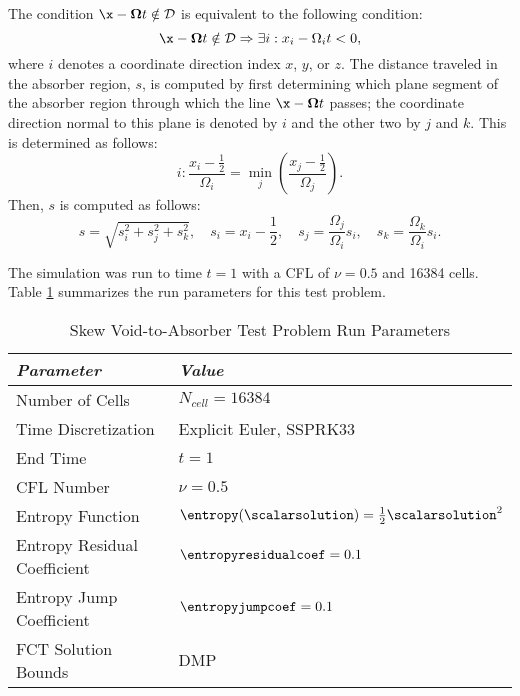 The condition $\x-\mathbf{\Omega}t\notin\mathcal{D}$ is equivalent to the
following condition:
\[
   \x-\mathbf{\Omega}t\notin\mathcal{D} \Rightarrow
   \exists i: x_i-\Omega_i t < 0,
\]
where $i$ denotes a coordinate direction index $x$, $y$, or $z$.
The distance traveled in the absorber region, $s$, is computed
by first determining which plane segment of the absorber region
through which the line $\x-\mathbf{\Omega}t$ passes; the coordinate
direction normal to this plane is denoted by $i$ and the other
two by $j$ and $k$. This is determined as follows:
\[
   i: \frac{x_i-\frac{1}{2}}{\Omega_i} = \min\limits_j\left(
      \frac{x_j-\frac{1}{2}}{\Omega_j}\right).
\]
Then, $s$ is computed as follows:
\begin{equation}\label{eq:s_distance}
   s=\sqrt{s_i^2 + s_j^2 + s_k^2}, \quad
   s_i=x_i-\frac{1}{2}, \quad
   s_j=\frac{\Omega_j}{\Omega_i}s_i, \quad
   s_k=\frac{\Omega_k}{\Omega_i}s_i.
\end{equation}

The simulation was run to time $t=1$ with a CFL of $\nu=0.5$ and 16384 cells.
Table \ref{tab:skew_void_to_absorber_run_parameters} summarizes the run parameters
for this test problem.

\begin{table}[ht]\caption{Skew Void-to-Absorber Test Problem Run Parameters}
\label{tab:skew_void_to_absorber_run_parameters}
\centering
\begin{tabular}{l l}\toprule
\emph{Parameter} & \emph{Value}\\\midrule
Number of Cells & $N_{cell} = 16384$\\
Time Discretization & Explicit Euler, SSPRK33\\
End Time & $t = 1$\\
CFL Number & $\nu = 0.5$\\\midrule
Entropy Function & $\entropy(\scalarsolution) = \frac{1}{2}\scalarsolution^2$\\
Entropy Residual Coefficient & $\entropyresidualcoef = 0.1$\\
Entropy Jump Coefficient & $\entropyjumpcoef = 0.1$\\\midrule
FCT Solution Bounds & DMP\\
\bottomrule\end{tabular}
\end{table}

